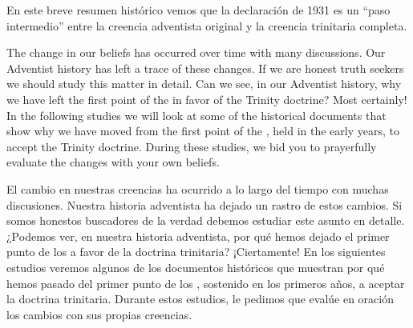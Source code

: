 En este breve resumen histórico vemos que la declaración de 1931 es un “paso intermedio” entre la creencia adventista original y la creencia trinitaria completa.


The change in our beliefs has occurred over time with many discussions. Our Adventist history has left a trace of these changes. If we are honest truth seekers we should study this matter in detail. Can we see, in our Adventist history, why we have left the first point of the  in favor of the Trinity doctrine? Most certainly! In the following studies we will look at some of the historical documents that show why we have moved from the first point of the , held in the early years, to accept the Trinity doctrine. During these studies, we bid you to prayerfully evaluate the changes with your own beliefs.


El cambio en nuestras creencias ha ocurrido a lo largo del tiempo con muchas discusiones. Nuestra historia adventista ha dejado un rastro de estos cambios. Si somos honestos buscadores de la verdad debemos estudiar este asunto en detalle. ¿Podemos ver, en nuestra historia adventista, por qué hemos dejado el primer punto de los  a favor de la doctrina trinitaria? ¡Ciertamente! En los siguientes estudios veremos algunos de los documentos históricos que muestran por qué hemos pasado del primer punto de los , sostenido en los primeros años, a aceptar la doctrina trinitaria. Durante estos estudios, le pedimos que evalúe en oración los cambios con sus propias creencias.






